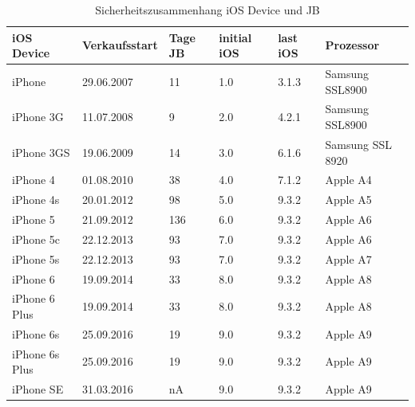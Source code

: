\begin{table}[htp!]
    \begin{center}
        \begin{tabular}{|l|l|l|l|l|l|} \hline
            \textbf{iOS Device} & \textbf{Verkaufsstart} & \textbf{Tage JB} & \textbf{initial iOS} & \textbf{last iOS }& \textbf{Prozessor}\\ \hline
            iPhone & 29.06.2007 & 11 & 1.0 & 3.1.3 & Samsung SSL8900\\ \hline
            iPhone 3G & 11.07.2008 & 9 & 2.0 & 4.2.1 & Samsung SSL8900 \\ \hline
            iPhone 3GS & 19.06.2009 & 14 & 3.0 & 6.1.6 & Samsung SSL 8920 \\ \hline
            iPhone 4 & 01.08.2010 & 38 & 4.0 & 7.1.2 & Apple A4 \\ \hline
            iPhone 4s & 20.01.2012 & 98 & 5.0 & 9.3.2 & Apple A5 \\ \hline 
            iPhone 5 & 21.09.2012 & 136 & 6.0 & 9.3.2 & Apple A6 \\ \hline
            iPhone 5c & 22.12.2013 & 93 & 7.0 & 9.3.2 & Apple A6 \\ \hline
            iPhone 5s & 22.12.2013 & 93 & 7.0 & 9.3.2 & Apple A7 \\ \hline
            iPhone 6 & 19.09.2014 & 33 & 8.0 & 9.3.2 & Apple A8 \\ \hline
            iPhone 6 Plus & 19.09.2014 & 33 & 8.0 & 9.3.2 & Apple A8 \\ \hline
            iPhone 6s & 25.09.2016 & 19 & 9.0 & 9.3.2 & Apple A9 \\ \hline
            iPhone 6s Plus & 25.09.2016 & 19 & 9.0 & 9.3.2 & Apple A9 \\ \hline
            iPhone SE & 31.03.2016 & nA & 9.0 & 9.3.2 & Apple A9 \\ \hline  
        \end{tabular} 
        \caption{Sicherheitszusammenhang iOS Device und JB }
        \label{tab:iOSHW}
    \end{center}
\end{table}

